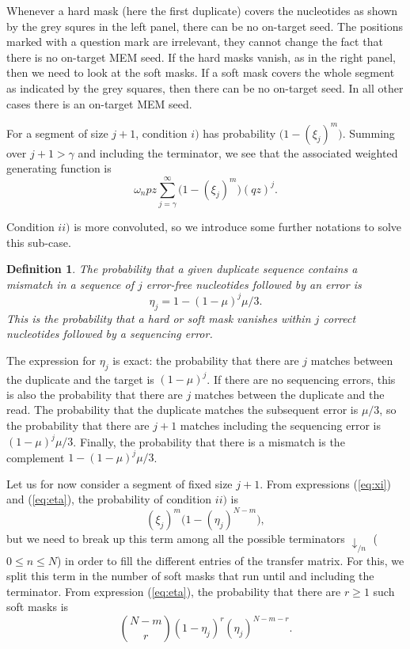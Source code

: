 \documentclass{article}
\newtheorem{definition}{Definition}
\begin{document}
Whenever a hard mask (here the first duplicate) covers the nucleotides as
shown by the grey squres in the left panel, there can be no on-target
seed. The positions marked with a question mark are irrelevant, they
cannot change the fact that there is no on-target MEM seed. If the hard
masks vanish, as in the right panel, then we need to look at the soft
masks. If a soft mask covers the whole segment as indicated by the grey
squares, then there can be no on-target seed. In all other cases there is
an on-target MEM seed.

For a segment of size $j+1$, condition $i)$ has probability $\big(1 -
(\xi_j)^m \big)$. Summing over $j+1 > \gamma$ and including the
terminator, we see that the associated weighted generating function is
\begin{equation*}
\omega_n pz \sum_{j=\gamma}^\infty \Big(1 - (\xi_j)^m \Big) (qz)^j.
\end{equation*}

Condition $ii)$ is more convoluted, so we introduce some further
notations to solve this sub-case.
\begin{definition}
The probability that a given duplicate sequence contains a mismatch in a
sequence of $j$ error-free nucleotides followed by an error is
\begin{equation}
\label{eq:eta}
\eta_j = 1-(1-\mu)^j\mu/3.
\end{equation}
This is the probability that a hard or soft mask vanishes within $j$
correct nucleotides followed by a sequencing error.
\end{definition}

The expression for $\eta_j$ is exact: the probability that there are $j$
matches between the duplicate and the target is $(1-\mu)^j$. If there are
no sequencing errors, this is also the probability that there are $j$
matches between the duplicate and the read. The probability that the
duplicate matches the subsequent error is $\mu/3$, so the probability
that there are $j+1$ matches including the sequencing error is
$(1-\mu)^j\mu/3$. Finally, the probability that there is a mismatch is the
complement $1-(1-\mu)^j\mu/3$.

Let us for now consider a segment of fixed size $j+1$. From expressions
(\ref{eq:xi}) and (\ref{eq:eta}), the probability of condition $ii)$ is
\begin{equation*}
(\xi_j)^m \Big(1 - (\eta_j)^{N-m} \Big),
\end{equation*}
but we need to break up this term among all the possible terminators
$\downarrow_{/n}$ ($0 \leq n \leq N$) in order to fill the different
entries of the transfer matrix. For this, we split this term in the number
of soft masks that run until and including the terminator. From expression
(\ref{eq:eta}), the probability that there are $r \geq 1$ such soft masks
is
\begin{equation}
\label{eq:softmasks_r}
{N-m \choose r} (1 - \eta_j)^r (\eta_j)^{N-m-r}.
\end{equation}
\end{document}
